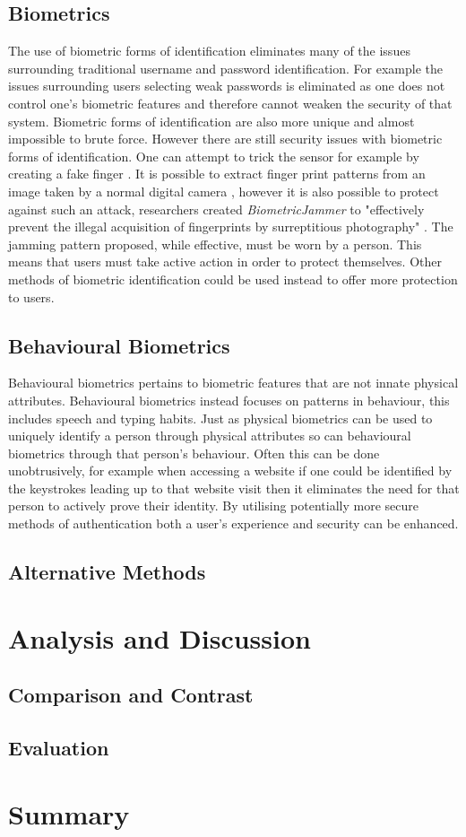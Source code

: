 \documentclass[12pt]{article}
\begin{document}
	\subsection{Biometrics}
	\label{subsect_biometrics}
	The use of biometric forms of identification eliminates many of the issues surrounding traditional username and password identification. For example the issues surrounding users selecting weak passwords is eliminated as one does not control one's biometric features and therefore cannot weaken the security of that system. Biometric forms of identification are also more unique and almost impossible to brute force.
	However there are still security issues with biometric forms of identification. One can attempt to trick the sensor for example by creating a fake finger \citep{ambalakat2005security}. It is possible to extract finger print patterns from an image taken by a normal digital camera \citep{ogane2017biometric}, however it is also possible to protect against such an attack, researchers created \emph{BiometricJammer} to "effectively prevent the illegal acquisition of fingerprints by surreptitious photography" \citep{ogane2017biometric}. The jamming pattern proposed, while effective, must be worn by a person. This means that users must take active action in order to protect themselves. Other methods of biometric identification could be used instead to offer more protection to users.
	\subsection{Behavioural Biometrics}
	\label{subsect_behavioral_biometrics}
	Behavioural biometrics pertains to biometric features that are not innate physical attributes. Behavioural biometrics instead focuses on patterns in behaviour, this includes speech and typing habits. Just as physical biometrics can be used to uniquely identify a person through physical attributes so can behavioural biometrics through that person's behaviour. Often this can be done unobtrusively, for example when accessing a website if one could be identified by the keystrokes leading up to that website visit then it eliminates the need for that person to actively prove their identity. By utilising potentially more secure methods of authentication both a user's experience and security can be enhanced.
	\subsection{Alternative Methods}
	
	
	\section{Analysis and Discussion}
	\label{sect_analysis}
	
	\subsection{Comparison and Contrast}
	
	
	\subsection{Evaluation}
	
	\section{Summary}
	
	
	 
	
\end{document}
